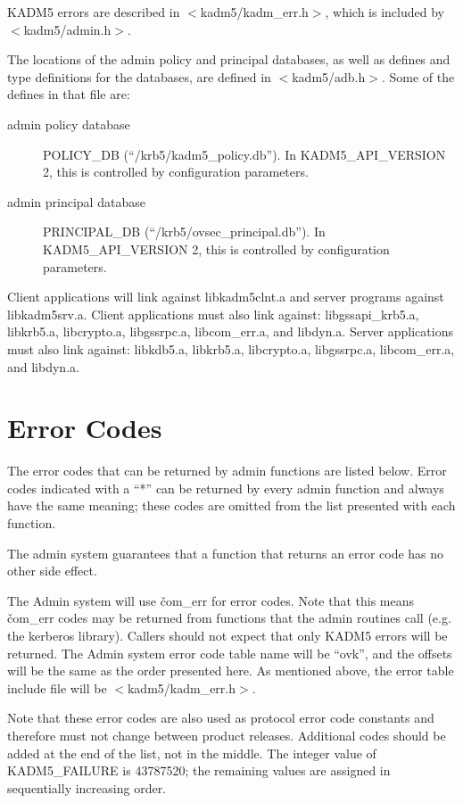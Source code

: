 KADM5 errors are described in $<$kadm5/kadm_err.h$>$, which
is included by $<$kadm5/admin.h$>$.

The locations of the admin policy and principal databases, as well as
defines and type definitions for the databases, are defined in
$<$kadm5/adb.h$>$.  Some of the defines in that file are:
\begin{description}
\item[admin policy database] POLICY_DB (``/krb5/kadm5_policy.db'').    In
KADM5_API_VERSION 2, this is controlled by configuration parameters.
\item[admin principal database] PRINCIPAL_DB
(``/krb5/ovsec_principal.db'').  In KADM5_API_VERSION 2, this is
controlled by configuration parameters.
\end{description}

Client applications will link against libkadm5clnt.a and server
programs against libkadm5srv.a.  Client applications must also link
against: libgssapi_krb5.a, libkrb5.a, libcrypto.a, libgssrpc.a,
libcom_err.a, and libdyn.a.  Server applications must also link
against: libkdb5.a, libkrb5.a, libcrypto.a, libgssrpc.a, libcom_err.a,
and libdyn.a.

\section{Error Codes}

The error codes that can be returned by admin functions are listed
below.  Error codes indicated with a ``*'' can be returned by every
admin function and always have the same meaning; these codes are
omitted from the list presented with each function.  

The admin system guarantees that a function that returns an error code
has no other side effect.

The Admin system will use \v{com_err} for error codes.  Note that this
means \v{com_err} codes may be returned from functions that the admin
routines call (e.g. the kerberos library). Callers should not expect
that only KADM5 errors will be returned.  The Admin system error code
table name will be ``ovk'', and the offsets will be the same as the
order presented here. As mentioned above, the error table include file
will be $<$kadm5/kadm_err.h$>$.

Note that these error codes are also used as protocol error code
constants and therefore must not change between product releases.
Additional codes should be added at the end of the list, not in the
middle.  The integer value of KADM5_FAILURE is 43787520; the
remaining values are assigned in sequentially increasing order.

